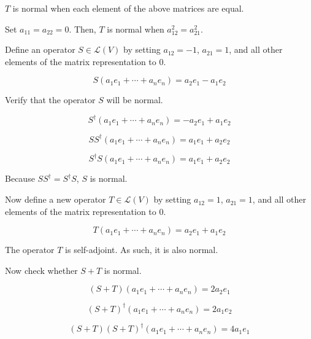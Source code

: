 \documentclass[fleqn]{article}
\begin{document}
\begin{enumerate}[nolistsep]
		$T$ is normal when each element of the above matrices are equal.
		
		Set $a_{11} = a_{22} = 0$. Then, $T$ is normal when $a_{12}^2 = a_{21}^2$.
		
		Define an operator $S \in \mathcal{L}(V)$ by setting $a_{12} = -1$, $a_{21} = 1$, and all other elements of the matrix representation to $0$.
		
		\begin{equation*}
			S(a_1e_1 + \cdots + a_ne_n) = a_2e_1 - a_1e_2
		\end{equation*}
		
		Verify that the operator $S$ will be normal.
		
		\begin{equation*}
			S^{\dag}(a_1e_1 + \cdots + a_ne_n) = -a_2e_1 + a_1e_2
		\end{equation*}
		
		\begin{equation*}
			SS^{\dag}(a_1e_1 + \cdots + a_ne_n) = a_1e_1 + a_2e_2
		\end{equation*}
		
		\begin{equation*}
			S^{\dag}S(a_1e_1 + \cdots + a_ne_n) = a_1e_1 + a_2e_2
		\end{equation*}
		
		Because $SS^{\dag} = S^{\dag}S$, $S$ is normal.
		
		Now define a new operator $T \in \mathcal{L}(V)$ by setting $a_{12} = 1$, $a_{21} = 1$, and all other elements of the matrix representation to $0$.
		
		\begin{equation*}
			T(a_1e_1 + \cdots + a_ne_n) = a_2e_1 + a_1e_2
		\end{equation*}
		
		The operator $T$ is self-adjoint. As such, it is also normal.
		
		Now check whether $S + T$ is normal.
		
		\begin{equation*}
			(S + T)(a_1e_1 + \cdots + a_ne_n) = 2a_2e_1
		\end{equation*}
		
		\begin{equation*}
			(S + T)^{\dag}(a_1e_1 + \cdots + a_ne_n) = 2a_1e_2
		\end{equation*}
			
		\begin{equation*}
			(S + T)(S + T)^{\dag}(a_1e_1 + \cdots + a_ne_n) = 4a_1e_1
		\end{equation*}
		

\end{enumerate}
\end{document}
